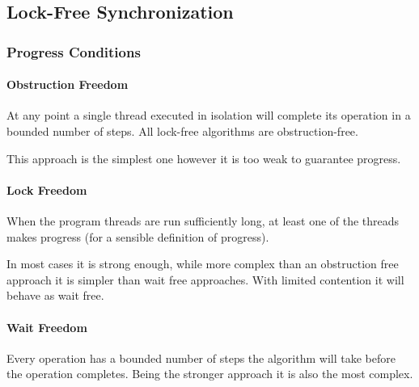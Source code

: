 \subsection{Lock-Free Synchronization}

\subsubsection{Progress Conditions}
\paragraph{Obstruction Freedom}
At any point a single thread executed in isolation will complete its operation in a bounded number of steps.
All lock-free algorithms are obstruction-free.

This approach is the simplest one however it is too weak to guarantee progress.

\paragraph{Lock Freedom}
When the program threads are run sufficiently long, at least one of the threads makes progress
(for a sensible definition of progress).

In most cases it is strong enough,
while more complex than an obstruction free approach it is simpler than wait free approaches.
With limited contention it will behave as wait free.

\paragraph{Wait Freedom}
Every operation has a bounded number of steps the algorithm will take before the operation completes.
Being the stronger approach it is also the most complex.